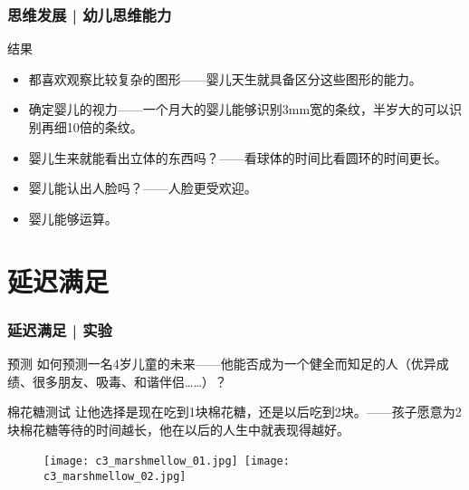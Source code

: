\begin{frame}
  \frametitle{思维发展 | 幼儿思维能力}
  \begin{block}{结果}
    \begin{itemize}
      \item 都喜欢观察比较复杂的图形——婴儿天生就具备区分这些图形的能力。
      \item 确定婴儿的视力——一个月大的婴儿能够识别3mm宽的条纹，半岁大的可以识别再细10倍的条纹。
      \item 婴儿生来就能看出立体的东西吗？——看球体的时间比看圆环的时间更长。
      \item 婴儿能认出人脸吗？——人脸更受欢迎。
      \item 婴儿能够运算。
    \end{itemize}
  \end{block}
\end{frame}

\section{延迟满足}
\begin{frame}
  \frametitle{延迟满足 | 实验}
  \begin{block}{预测}
    如何预测一名4岁儿童的未来——他能否成为一个健全而知足的人（优异成绩、很多朋友、吸毒、和谐伴侣……）？
  \end{block}
  \pause
  \begin{block}{棉花糖测试}
    让他选择是现在吃到1块棉花糖，还是以后吃到2块。——孩子愿意为2块棉花糖等待的时间越长，他在以后的人生中就表现得越好。
    \vspace{-1em}
    \begin{figure}
      \centering
      \texttt{[image: c3\_marshmellow\_01.jpg]}\ 
      \texttt{[image: c3\_marshmellow\_02.jpg]}
    \end{figure}
  \end{block}
\end{frame}

